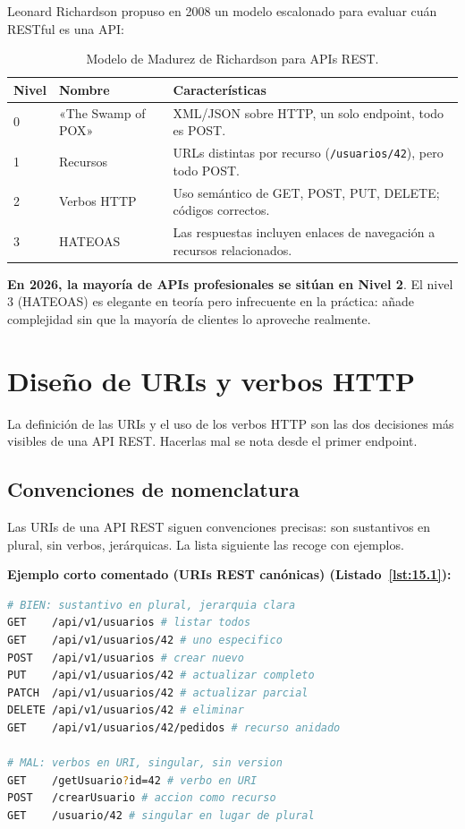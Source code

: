 Leonard Richardson propuso en 2008 un modelo escalonado para evaluar
cuán RESTful es una API:

\begin{table}[htbp]
\centering
\caption{Modelo de Madurez de Richardson para APIs REST.}
\footnotesize
\begin{tabularx}{\textwidth}{llX}
\toprule
\textbf{Nivel} & \textbf{Nombre} & \textbf{Características}\\
\midrule
0 & «The Swamp of POX» & XML/JSON sobre HTTP, un solo endpoint, todo es POST.\\
1 & Recursos & URLs distintas por recurso (\texttt{/usuarios/42}), pero todo POST.\\
2 & Verbos HTTP & Uso semántico de GET, POST, PUT, DELETE; códigos correctos.\\
3 & HATEOAS & Las respuestas incluyen enlaces de navegación a recursos relacionados.\\
\bottomrule
\end{tabularx}
\end{table}

\textbf{En 2026, la mayoría de APIs profesionales se sitúan en
Nivel 2}. El nivel 3 (HATEOAS) es elegante en teoría pero
infrecuente en la práctica: añade complejidad sin que la mayoría de
clientes lo aproveche realmente.

\section{Diseño de URIs y verbos HTTP}

La definición de las URIs y el uso de los verbos HTTP son
las dos decisiones más visibles de una API REST. Hacerlas mal se
nota desde el primer endpoint.


\subsection{Convenciones de nomenclatura}

Las URIs de una API REST siguen convenciones precisas: son
sustantivos en plural, sin verbos, jerárquicas. La lista siguiente
las recoge con ejemplos.

\textbf{Ejemplo corto comentado (URIs REST canónicas) (Listado~\ref{lst:15.1}):}
\begin{lstlisting}[language=bash,numbers=none,caption={Ejemplo de Shell},label=lst:15.1]
# BIEN: sustantivo en plural, jerarquia clara
GET    /api/v1/usuarios # listar todos
GET    /api/v1/usuarios/42 # uno especifico
POST   /api/v1/usuarios # crear nuevo
PUT    /api/v1/usuarios/42 # actualizar completo
PATCH  /api/v1/usuarios/42 # actualizar parcial
DELETE /api/v1/usuarios/42 # eliminar
GET    /api/v1/usuarios/42/pedidos # recurso anidado

# MAL: verbos en URI, singular, sin version
GET    /getUsuario?id=42 # verbo en URI
POST   /crearUsuario # accion como recurso
GET    /usuario/42 # singular en lugar de plural
\end{lstlisting}


